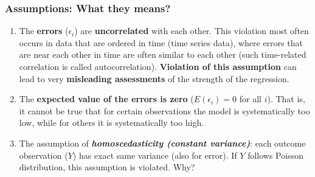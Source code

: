 \documentclass[10pt]{beamer} %
\begin{document}
\begin{frame}
	\frametitle{Assumptions: What they means? }

\begin{enumerate}
	\item The \textbf{errors} ($\epsilon_i$) are \textbf{uncorrelated} with each other. This violation most often occurs in data that are ordered in time (time series data), where errors that are near each other in time are often similar to each other (such time-related correlation is called autocorrelation). \textbf{Violation of this assumption} can lead to very \textbf{misleading assessments} of the strength of the regression.
			\vspace{0.5cm}	
	\item The \textbf{expected value of the errors is zero} ($E(\epsilon_{i}) = 0$ for all $i$). That is, it cannot be true that for certain observations the model is systematically too low, while for others it is systematically too high.
			\vspace{0.5cm}	
	
	\item 	The assumption of \emph{\textbf{homoscedasticity (constant variance)}}: each outcome observation ($Y$) has exact same variance (also for error). If $Y$ follows Poisson distribution, this assumption is violated. Why?
	
	
	
\end{enumerate}

\end{frame}
\end{document}
